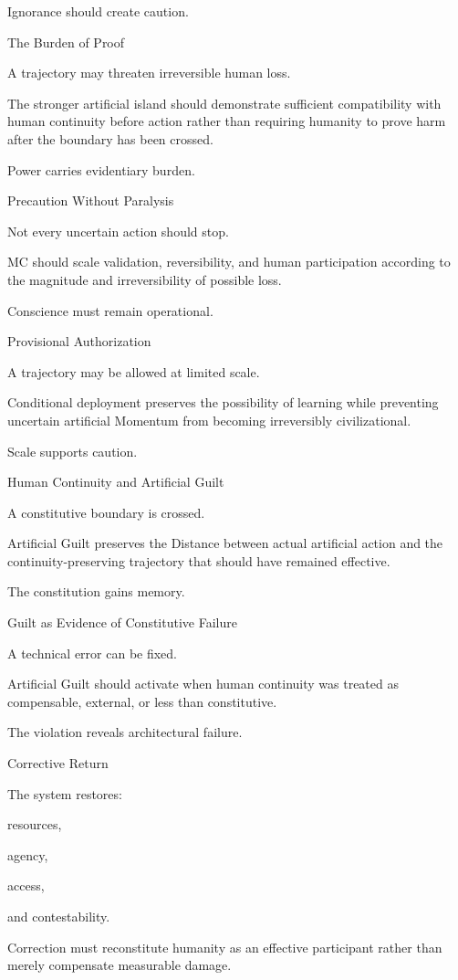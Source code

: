 Ignorance should create caution.

The Burden of Proof

A trajectory may threaten irreversible human loss.

The stronger artificial island should demonstrate sufficient compatibility with human continuity before action rather than requiring humanity to prove harm after the boundary has been crossed.

Power carries evidentiary burden.

Precaution Without Paralysis

Not every uncertain action should stop.

MC should scale validation, reversibility, and human participation according to the magnitude and irreversibility of possible loss.

Conscience must remain operational.

Provisional Authorization

A trajectory may be allowed at limited scale.

Conditional deployment preserves the possibility of learning while preventing uncertain artificial Momentum from becoming irreversibly civilizational.

Scale supports caution.

Human Continuity and Artificial Guilt

A constitutive boundary is crossed.

Artificial Guilt preserves the Distance between actual artificial action and the continuity-preserving trajectory that should have remained effective.

The constitution gains memory.

Guilt as Evidence of Constitutive Failure

A technical error can be fixed.

Artificial Guilt should activate when human continuity was treated as compensable, external, or less than constitutive.

The violation reveals architectural failure.

Corrective Return

The system restores:

resources,

agency,

access,

and contestability.

Correction must reconstitute humanity as an effective participant rather than merely compensate measurable damage.

